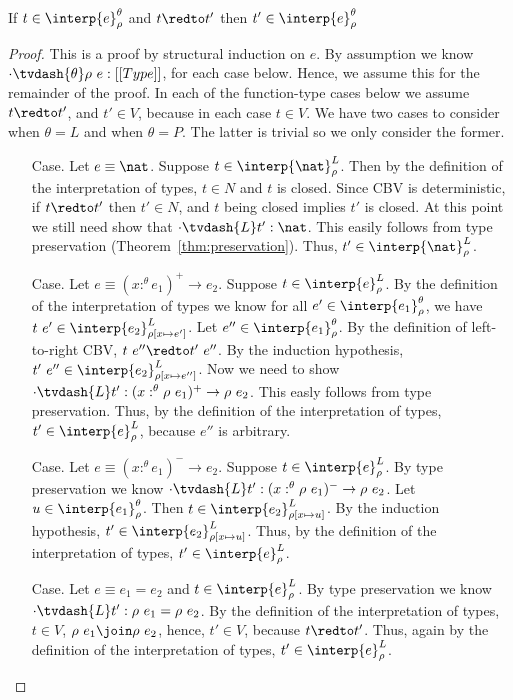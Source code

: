 \begin{lemma}[$\CRII$]
  \label{lemma:crii}
  If $t \in \interp{e}^\theta_\rho$ and $t \redto t'$ then $t' \in \interp{e}^\theta_\rho$
\end{lemma}
\begin{proof}
  This is a proof by structural induction on $e$.  By assumption we know 
  $\cdot \tvdash{\theta} \rho\ e:[[Type]]$, for each case below.  Hence, we assume this for
  the remainder of the proof.  In each of the function-type cases below we 
  assume $t \redto t'$, and $t' \in V$, because in each case $t \in V$.  We have two cases
  to consider when $\theta = L$ and when $\theta = P$.  The latter is trivial so we only
  consider the former.

  \begin{itemize}
  \item[Case.] Let $e \equiv \nat$.  
    Suppose $t \in \interp{\nat}^L_\rho$.  Then by the definition of the 
    interpretation of types, $t \in N$ and $t$ is closed.  Since CBV is deterministic,
    if $t \redto t'$ then $t' \in N$, and $t$ being closed implies $t'$ is closed.  At this
    point we still need show that $\cdot \tvdash{L} t':\nat$.  This easily follows from
    type preservation (Theorem~\ref{thm:preservation}). Thus, $t' \in \interp{\nat}^L_\rho$.

  \item[Case.] Let $e \equiv (x :^\theta e_1)^+ \rightarrow e_2$.    
    Suppose $t \in \interp{e}^L_\rho$.  By the definition of the interpretation of types we know 
    for all $e' \in \interp{e_1}^\theta_\rho$, we have 
    $t\ e' \in \interp{e_2}^L_{\rho[x \mapsto e']}$.  
    Let $e'' \in \interp{e_1}^\theta_\rho$.  By the definition of left-to-right CBV, 
    $t\ e'' \redto t'\ e''$.  By the induction hypothesis, 
    $t'\ e'' \in \interp{e_2}^L_{\rho[x \mapsto e'']}$.  Now we need to show
    $\cdot \tvdash{L} t':(x :^\theta \rho\ e_1)^+ \rightarrow \rho\ e_2$.  This easly follows
    from type preservation.  Thus, by the definition 
    of the interpretation of types, $t' \in \interp{e}^L_{\rho}$, because $e''$ is arbitrary.
    
  \item[Case.] Let $e \equiv (x :^\theta e_1)^- \to e_2$.
    Suppose $t \in \interp{e}^L_\rho$.  By type preservation we know 
    $\cdot \tvdash{L} t':(x :^\theta \rho\ e_1)^- \to \rho\ e_2$.
    Let $u \in \interp{e_1}^\theta_\rho$. Then 
    $t \in \interp{e_2}^L_{\rho[x \mapsto u]}$.  By the induction hypothesis,
    $t' \in \interp{e_2}^L_{\rho[x \mapsto u]}$.  Thus, by the definition
    of the interpretation of types, $t' \in \interp{e}^L_\rho$.
      
  \item[Case.] Let $e \equiv e_1 = e_2$ and $t \in \interp{e}^L_\rho$.  
    By type preservation we know 
    $\cdot \tvdash{L} t':\rho\ e_1 = \rho\ e_2$.  By the definition of the 
    interpretation of types, $t \in V$, $\rho\ e_1 \join \rho\ e_2$, hence, 
    $t' \in V$, because $t \redto t'$.  Thus, again by the definition 
    of the interpretation of types, $t' \in \interp{e}^L_\rho$.    
  \end{itemize}
\end{proof}

